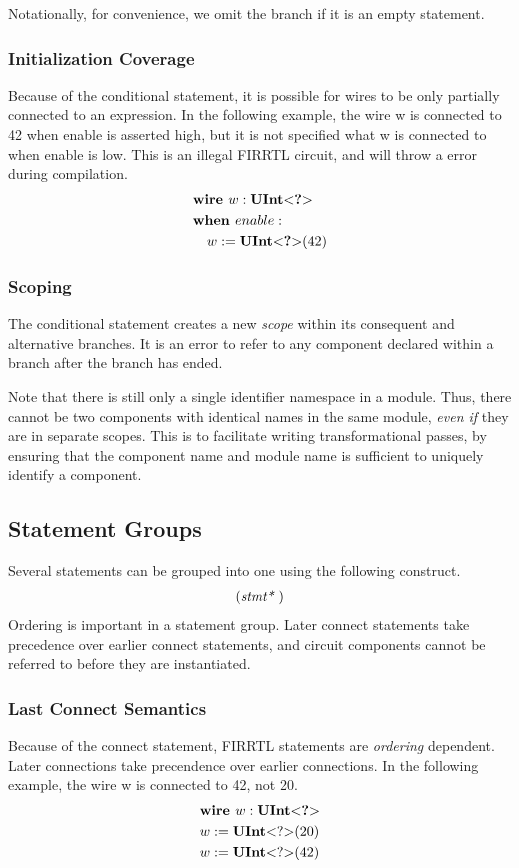 \documentclass[10pt]{article}
\begin{document}
Notationally, for convenience, we omit the  branch if it is an empty statement. 

\subsubsection{Initialization Coverage}
Because of the conditional statement, it is possible for wires to be only partially connected to an expression.
In the following example, the wire w is connected to 42 when enable is asserted high, but it is not specified what w is connected to when enable is low.
This is an illegal FIRRTL circuit, and will throw a  error during compilation.
\[
\begin{aligned}
&\text{\bf wire\ } w : \text{\bf UInt}\text{\bf $<$} \text{\bf ?} \text{\bf $>$} \\
&\text{\bf when\ } enable : \\
&\quad w := \text{\bf UInt}\text{\bf $<$} \text{\bf ?} \text{\bf $>$}(42) \\
\end{aligned}
\]

\subsubsection{Scoping}
The conditional statement creates a new {\em scope} within its consequent and alternative branches.
It is an error to refer to any component declared within a branch after the branch has ended.

Note that there is still only a single identifier namespace in a module.
Thus, there cannot be two components with identical names in the same module, {\em even if} they are in separate scopes.
This is to facilitate writing transformational passes, by ensuring that the component name and module name is sufficient to uniquely identify a component.

\subsection{Statement Groups}
Several statements can be grouped into one using the following construct.
\[
\begin{aligned}
(\text{\em stmt*\ })
\end{aligned}
\]
Ordering is important in a statement group.
Later connect statements take precedence over earlier connect statements, and circuit components cannot be referred to before they are instantiated.

\subsubsection{Last Connect Semantics}
Because of the connect statement, FIRRTL statements are {\em ordering} dependent.
Later connections take precendence over earlier connections.
In the following example, the wire w is connected to 42, not 20. 
\[
\begin{aligned}
&\text{\bf wire\ } w : \text{\bf UInt}\text{\bf $<$} \text{\bf ?} \text{\bf $>$} \\
&w := \text{\bf UInt}\text{\bf $<$} ? \text{\bf $>$}(20) \\
&w := \text{\bf UInt}\text{\bf $<$} ? \text{\bf $>$}(42) \\
\end{aligned}
\]
\end{document}
